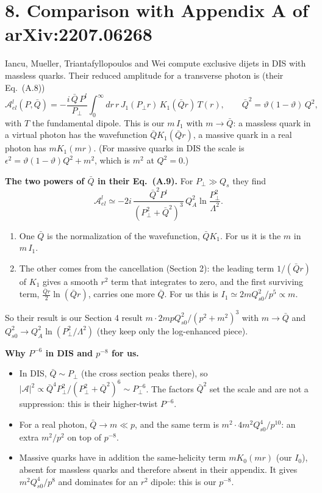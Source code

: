 \documentclass[12pt]{article}
\begin{document}
\section*{8. Comparison with Appendix A of arXiv:2207.06268}

Iancu, Mueller, Triantafyllopoulos and Wei compute exclusive dijets in DIS with massless quarks.
Their reduced amplitude for a transverse photon is (their Eq.~(A.8))
\[
  \mathcal A^l_{el}(P,\bar Q)=-\frac{i\,\bar Q\,P^l}{P_\perp}\int_0^\infty dr\,r\,J_1(P_\perp r)\,K_1(\bar Qr)\,T(r),
  \qquad \bar Q^2=\vartheta(1-\vartheta)\,Q^2 ,
\]
with $T$ the fundamental dipole. This is our $m\,I_1$ with $m\to\bar Q$: a massless quark in a virtual
photon has the wavefunction $\bar Q K_1(\bar Qr)$, a massive quark in a real photon has $mK_1(mr)$.
(For massive quarks in DIS the scale is $\epsilon^2=\vartheta(1-\vartheta)Q^2+m^2$, which is $m^2$ at $Q^2=0$.)

\textbf{The two powers of $\bar Q$ in their Eq.~(A.9).} For $P_\perp\gg Q_s$ they find
\[
  \mathcal A^l_{el}\simeq-2i\,\frac{\bar Q^2P^l}{(P_\perp^2+\bar Q^2)^3}\,Q_A^2\ln\frac{P_\perp^2}{\Lambda^2}.
\]
\begin{enumerate}
\item One $\bar Q$ is the normalization of the wavefunction, $\bar Q K_1$. For us it is the $m$ in
$m\,I_1$.
\item The other comes from the cancellation (Section 2): the leading term $1/(\bar Qr)$ of $K_1$ gives
a smooth $r^2$ term that integrates to zero, and the first surviving term,
$\tfrac{\bar Qr}{2}\ln(\bar Qr)$, carries one more $\bar Q$. For us this is $I_1\simeq2mQ_{s0}^2/p^5\propto m$.
\end{enumerate}
So their result is our Section 4 result $m\cdot2mpQ_{s0}^2/(p^2+m^2)^3$ with $m\to\bar Q$ and
$Q_{s0}^2\to Q_A^2\ln(P_\perp^2/\Lambda^2)$ (they keep only the log-enhanced piece).

\textbf{Why $P^{-6}$ in DIS and $p^{-8}$ for us.}
\begin{itemize}
\item In DIS, $\bar Q\sim P_\perp$ (the cross section peaks there), so
$|\mathcal A|^2\propto\bar Q^4P_\perp^2/(P_\perp^2+\bar Q^2)^6\sim P_\perp^{-6}$. The factors $\bar Q^2$ set the
scale and are not a suppression: this is their higher-twist $P^{-6}$.
\item For a real photon, $\bar Q\to m\ll p$, and the same term is $m^2\cdot4m^2Q_{s0}^4/p^{10}$: an extra
$m^2/p^2$ on top of $p^{-8}$.
\item Massive quarks have in addition the same-helicity term $mK_0(mr)$ (our $I_0$), absent for massless
quarks and therefore absent in their appendix. It gives $m^2Q_{s0}^4/p^8$ and dominates for an $r^2$
dipole: this is our $p^{-8}$.
\end{itemize}
\end{document}
